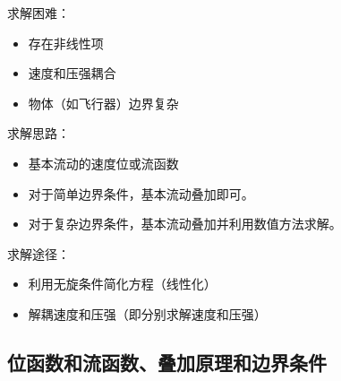 \noindent
\begin{minipage}{0.4\linewidth}
	\noindent 求解困难：\vspace*{-0.5em}
	\begin{itemize}
		\item 存在非线性项\vspace*{-0.5em}
		\item 速度和压强耦合\vspace*{-0.5em}
		\item 物体（如飞行器）边界复杂
	\end{itemize}
\end{minipage}
\begin{minipage}{0.6\linewidth}
	\noindent 求解思路：\vspace*{-0.5em}
	\begin{itemize}
		\item 基本流动的速度位或流函数\vspace*{-0.5em}
		\item 对于简单边界条件，基本流动叠加即可。\vspace*{-0.5em}
		\item 对于复杂边界条件，基本流动叠加并利用数值方法求解。
	\end{itemize}
\end{minipage}
\vspace*{1em}

\noindent 求解途径：\vspace*{-0.5em}
\begin{itemize}
	\item 利用无旋条件简化方程（线性化）\vspace*{-0.5em}
	\item 解耦速度和压强（即分别求解速度和压强）\vspace*{-0.5em}
\end{itemize}
\vspace*{1em}


\subsection{位函数和流函数、叠加原理和边界条件}

\sssection[位函数]

